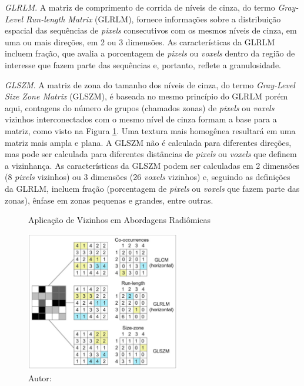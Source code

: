  \textit{GLRLM}. A matriz de comprimento de corrida de níveis de cinza, do termo 
 \textit{Gray-Level Run-length Matrix} (GLRLM), fornece informações sobre a distribuição espacial das sequências de \textit{pixels} consecutivos com os mesmos níveis de cinza, em uma ou mais direções, em 2 ou 3 dimensões. As características da GLRLM incluem fração, que avalia a porcentagem de \textit{pixels} ou \textit{voxels} dentro da região de interesse que fazem parte das sequências e, portanto, reflete a granulosidade. 

\textit{GLSZM}. A matriz de zona do tamanho dos níveis de cinza, do termo \textit{Gray-Level Size Zone Matrix} (GLSZM), é baseada no mesmo princípio do GLRLM porém aqui, contagens do número de grupos (chamados zonas) de \textit{pixels} ou \textit{voxels} vizinhos interconectados com o mesmo nível de cinza formam a base para a matriz, como visto na Figura \ref{fig:fig002}. Uma textura mais homogênea resultará em uma matriz mais ampla e plana. A GLSZM não é calculada para diferentes direções, mas pode ser calculada para diferentes distâncias de \textit{pixels} ou \textit{voxels} que definem a vizinhança. As características da GLSZM podem ser calculadas em 2 dimensões (8 \textit{pixels} vizinhos) ou 3 dimensões (26 \textit{voxels} vizinhos) e, seguindo as definições da GLRLM, incluem fração (porcentagem de \textit{pixels} ou \textit{voxels} que fazem parte das zonas), ênfase em zonas pequenas e grandes, entre outras.

\begin{figure}[htbp]
    \centering
    \caption{Aplicação de Vizinhos em Abordagens Radiômicas}
    \includegraphics[width=0.6\textwidth]{figures/fig002.png}
    \caption*{Autor: \cite{mayerhoeferIntroductionRadiomics2020}}
    \label{fig:fig002}
\end{figure}

